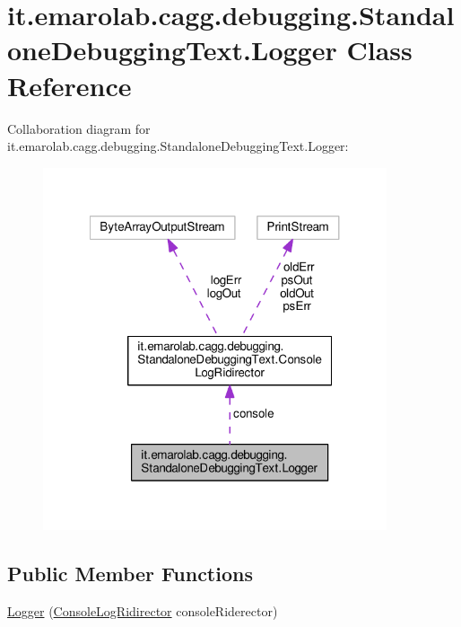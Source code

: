 \hypertarget{classit_1_1emarolab_1_1cagg_1_1debugging_1_1StandaloneDebuggingText_1_1Logger}{\section{it.\-emarolab.\-cagg.\-debugging.\-Standalone\-Debugging\-Text.\-Logger Class Reference}
\label{classit_1_1emarolab_1_1cagg_1_1debugging_1_1StandaloneDebuggingText_1_1Logger}
}


Collaboration diagram for it.\-emarolab.\-cagg.\-debugging.\-Standalone\-Debugging\-Text.\-Logger\-:
\nopagebreak
\begin{figure}[H]
\begin{center}
\leavevmode
\includegraphics[width=287pt]{classit_1_1emarolab_1_1cagg_1_1debugging_1_1StandaloneDebuggingText_1_1Logger__coll__graph}
\end{center}
\end{figure}
\subsection*{Public Member Functions}
\begin{DoxyCompactItemize}
\item 
\hyperlink{classit_1_1emarolab_1_1cagg_1_1debugging_1_1StandaloneDebuggingText_1_1Logger_a1279f1208c6d827438ad33f8e722216f}{Logger} (\hyperlink{classit_1_1emarolab_1_1cagg_1_1debugging_1_1StandaloneDebuggingText_1_1ConsoleLogRidirector}{Console\-Log\-Ridirector} console\-Riderector)
\end{DoxyCompactItemize}
